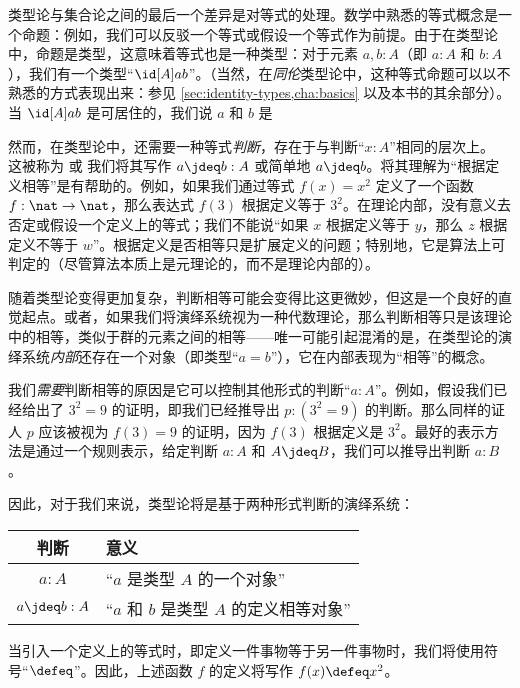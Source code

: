 类型论与集合论之间的最后一个差异是对等式的处理。数学中熟悉的等式概念是一个命题：例如，我们可以反驳一个等式或假设一个等式作为前提。由于在类型论中，命题是类型，这意味着等式也是一种类型：对于元素 $a,b:A$（即 $a:A$ 和 $b:A$），我们有一个类型“$\id[A]ab$”。（当然，在\emph{同伦}类型论中，这种等式命题可以以不熟悉的方式表现出来：参见 \cref{sec:identity-types,cha:basics} 以及本书的其余部分）。当 $\id[A]ab$ 是可居住的，我们说 $a$ 和 $b$ 是 %

然而，在类型论中，还需要一种等式\emph{判断}，存在于与判断“$x:A$”相同的层次上。
%
这被称为 %
%
或 %
%
我们将其写作 $a\jdeq b : A$ 或简单地 $a \jdeq b$。将其理解为“根据定义相等”是有帮助的。例如，如果我们通过等式 $f(x)=x^2$ 定义了一个函数 $f:\nat\to\nat$，那么表达式 $f(3)$ 根据定义等于 $3^2$。在理论内部，没有意义去否定或假设一个定义上的等式；我们不能说“如果 $x$ 根据定义等于 $y$，那么 $z$ 根据定义不等于 $w$”。根据定义是否相等只是扩展定义的问题；特别地，它是算法上可判定的（尽管算法本质上是元理论的，而不是理论内部的）。

随着类型论变得更加复杂，判断相等可能会变得比这更微妙，但这是一个良好的直觉起点。或者，如果我们将演绎系统视为一种代数理论，那么判断相等只是该理论中的相等，类似于群的元素之间的相等——唯一可能引起混淆的是，在类型论的演绎系统\emph{内部}还存在一个对象（即类型“$a=b$”），它在内部表现为“相等”的概念。

我们\emph{需要}判断相等的原因是它可以控制其他形式的判断“$a:A$”。例如，假设我们已经给出了 $3^2=9$ 的证明，即我们已经推导出 $p:(3^2=9)$ 的判断。那么同样的证人 $p$ 应该被视为 $f(3)=9$ 的证明，因为 $f(3)$ 根据定义是 $3^2$。最好的表示方法是通过一个规则表示，给定判断 $a:A$ 和 $A\jdeq B$，我们可以推导出判断 $a:B$。

因此，对于我们来说，类型论将是基于两种形式判断的演绎系统：
\begin{center}
  \medskip
  \begin{tabular}{cl}
    \toprule
    判断 & 意义\\
    \midrule
    $a : A$       & “$a$ 是类型 $A$ 的一个对象”\\
    $a \jdeq b : A$ & “$a$ 和 $b$ 是类型 $A$ 的定义相等对象”\\
    \bottomrule
  \end{tabular}
  \medskip
\end{center}
%
%
当引入一个定义上的等式时，即定义一件事物等于另一件事物时，我们将使用符号“$\defeq$”。因此，上述函数 $f$ 的定义将写作 $f(x)\defeq x^2$。

